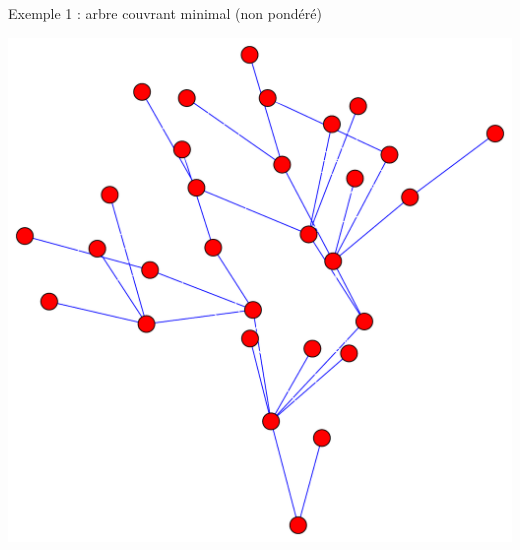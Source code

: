 \begin{frame}{Exemple 1 : arbre couvrant minimal (non pondéré)}
    \begin{center}
        \includegraphics[height=.8\textheight]{fig/mst-2.pdf}
    \end{center}
\end{frame}

